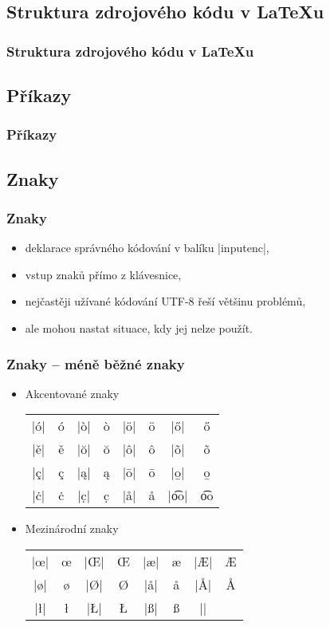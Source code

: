 \subsection{Struktura zdrojového kódu v \LaTeX{}u}
\begin{frame}
	\frametitle{Struktura zdrojového kódu v \LaTeX{}u}
\end{frame}


\subsection{Příkazy}
\begin{frame}
	\frametitle{Příkazy}
\end{frame}


\subsection{Znaky}
\begin{frame}[fragile]
	\frametitle{Znaky}
	\begin{itemize}
		\item deklarace správného kódování v balíku |inputenc|,
		\item vstup znaků přímo z klávesnice,
		\item nejčastěji užívané kódování UTF-8 řeší většinu problémů,
		\item ale mohou nastat situace, kdy jej nelze použít.
	\end{itemize}
\end{frame}


\begin{frame}[fragile]
	\frametitle{Znaky -- méně běžné znaky}
	\begin{itemize}
		\item Akcentované znaky
			\begin{center}
				\begin{tabular}{*{8}{c}}
					|\'{o}| & \'{o} & |\`{o}| & \`{o} & |\"{o}| & \"{o} & |\H{o}| & \H{o}\\
					|\v{e}| & \v{e} & |\u{o}| & \u{o} & |\^{o}| & \^{o} & |\~{o}| & \~{o}\\
					|\c{c}| & \c{c} & |\k{a}| & \k{a} & |\={o}| & \={o} & |\b{o}| & \b{o}\\
					|\.{c}| & \.{c} & |\d{c}| & \d{c} & |\r{a}| & \r{a} & |\t{oo}| & \t{oo}\\
				\end{tabular}
			\end{center}
		\item Mezinárodní znaky
			\begin{center}
				\begin{tabular}{*{8}{c}}
					|\oe| & \oe & |\OE| & \OE & |\ae| & \ae & |\AE| & \AE\\
					|\o| & \o & |\O| & \O & |\aa| & \aa & |\AA| & \AA\\
					|\l| & \l & |\L| & \L & |\ss| & \ss & |\SS| & \SS\\
				\end{tabular}
			\end{center}
	\end{itemize}
\end{frame}


